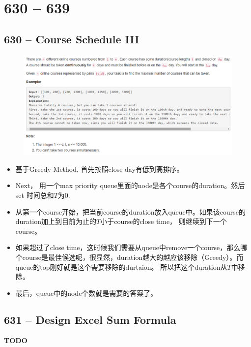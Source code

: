 \documentclass[a4paper,12pt]{article}
\begin{document}
\section{630 -- 639}
\subsection{630 -- Course Schedule III}
\begin{figure}[H]
	\begin{center}
		\includegraphics[width=18cm]{630.png}
	\end{center}
\end{figure}
\begin{CJK*}{UTF8}{gbsn}
	\begin{itemize}
		\item 基于Greedy Method, 首先按照close day有低到高排序。
		\item Next， 用一个max priority queue里面的node是各个course的duration。然后set 时间总和$T$为$0$.
		\item 从第一个course开始，把当前course的duration放入queue中。如果该course的duration加上到目前为止的$T$小于course的close time， 则继续到下一个course。
		\item 如果超过了close time，这时候我们需要从queue中remove一个course，那么哪个course是最佳候选呢，很显然，duration越大的越应该移除（Greedy）。而queue的top刚好就是这个需要移除的durtaion。 所以把这个duration从$T$中移除。
		\item 最后，queue中的node个数就是需要的答案了。
	\end{itemize}
\clearpage
\end{CJK*}

\subsection{631 -- Design Excel Sum Formula}
\textbf{\Huge{TODO}}
\end{document}
